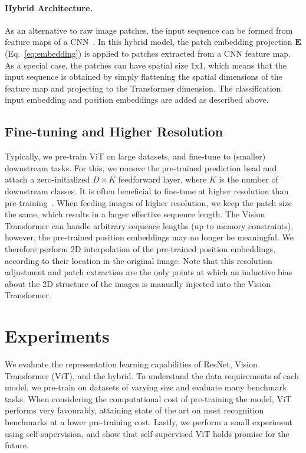 \paragraph{Hybrid Architecture.} As an alternative to raw image patches, the input sequence can be formed from feature maps of a CNN~\citep{LeCun1989BackpropagationAT}. In this hybrid model, the patch embedding projection $\mathbf{E}$  (Eq.~\ref{eq:embedding}) is applied to patches extracted from a CNN feature map. As a special case, the patches can have spatial size 1x1, which means that the input sequence is obtained by simply flattening the spatial dimensions of the feature map and projecting to the Transformer dimension. The classification input embedding and position embeddings are added as described above.

\subsection{Fine-tuning and Higher Resolution}

Typically, we pre-train ViT on large datasets, and fine-tune to (smaller) downstream  tasks. For this, we remove the pre-trained prediction head and attach a zero-initialized $D\times K$ feedforward layer, where $K$ is the number of downstream classes. It is often beneficial to fine-tune at higher resolution than pre-training~\citep{touvron2019,kolesnikov2020-bit}. When feeding images of higher resolution, we keep the patch size the same, which results in a larger effective sequence length. The Vision Transformer can handle arbitrary sequence lengths (up to memory constraints), however, the pre-trained position embeddings may no longer be meaningful. We therefore perform 2D interpolation of the pre-trained position embeddings, according to their location in the original image. Note that this resolution adjustment and patch extraction are the only points at which an inductive bias about the 2D structure of the images is manually injected into the Vision Transformer.

\section{Experiments}
We evaluate the representation learning capabilities of ResNet, Vision Transformer (ViT), and the hybrid. To understand the data requirements of each model, we pre-train on datasets of varying size and evaluate many benchmark tasks. When considering the computational cost of pre-training the model, ViT performs very favourably, attaining state of the art on most recognition benchmarks at a lower pre-training cost. Lastly, we perform a small experiment using self-supervision, and show that self-supervised ViT holds promise for the future.

